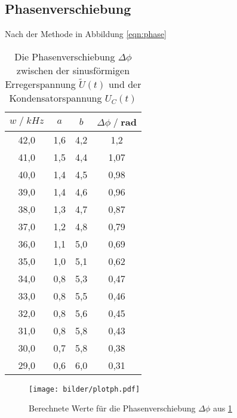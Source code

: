 \subsection{Phasenverschiebung}
Nach der Methode in Abbildung \ref{eqn:phase}
\begin{table}
    \centering
    \begin{tabular}{c c c c}
        \toprule
        $w\;/\;kHz$ & $a$ & $b$ & $\Delta \phi\;/\;$rad\\
        \midrule
        42,0 & 1,6 & 4,2 & 1,2 \\
        41,0 & 1,5 & 4,4 & 1,07 \\
        40,0 & 1,4 & 4,5 & 0,98 \\
        39,0 & 1,4 & 4,6 & 0,96 \\
        38,0 & 1,3 & 4,7 & 0,87 \\
        37,0 & 1,2 & 4,8 & 0,79 \\
        36,0 & 1,1 & 5,0 & 0,69 \\
        35,0 & 1,0 & 5,1 & 0,62 \\
        34,0 & 0,8 & 5,3 & 0,47 \\
        33,0 & 0,8 & 5,5 & 0,46 \\
        32,0 & 0,8 & 5,6 & 0,45 \\
        31,0 & 0,8 & 5,8 & 0,43 \\
        30,0 & 0,7 & 5,8 & 0,38 \\
        29,0 & 0,6 & 6,0 & 0,31 \\
        \bottomrule
    \end{tabular}
    \caption{Die Phasenverschiebung $\Delta \phi$ zwischen der sinusförmigen Erregerspannung $\tilde{U}(t)$ und der Kondensatorspannung $U_C(t)$}
    \label{tab:tabelle_phi}
\end{table}
\begin{figure}
    \centering
    \texttt{[image: bilder/plotph.pdf]}
    \caption{
        Berechnete Werte für die Phasenverschiebung $\Delta \phi$ aus \ref{tab:tabelle_phi} 
    }
\end{figure}





\label{sec:Auswertung}